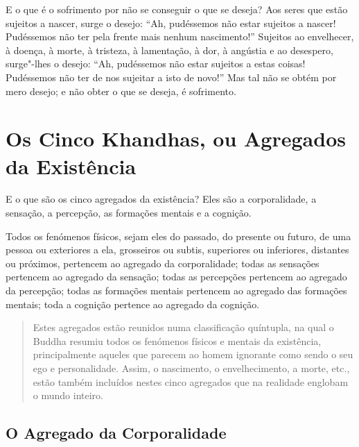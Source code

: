 E o que é o sofrimento por não se conseguir o que se deseja? Aos seres que estão
sujeitos a nascer, surge o desejo: “Ah, pudéssemos não estar sujeitos a nascer!
Pudéssemos não ter pela frente mais nenhum nascimento!” Sujeitos ao
envelhecer, à doença, à morte, à tristeza, à lamentação, à dor, à angústia e ao
desespero, surge"-lhes o desejo: “Ah, pudéssemos não estar sujeitos a estas
coisas! Pudéssemos não ter de nos sujeitar a isto de novo!” Mas tal não se
obtém por mero desejo; e não obter o que se deseja, é sofrimento.


\clearpage

\section{Os Cinco Khandhas, ou Agregados da Existência}


E o que são os cinco agregados da existência? Eles são a corporalidade, a
sensação, a percepção, as formações mentais e a cognição.


Todos os fenómenos físicos, sejam eles do passado, do presente ou futuro, de uma
pessoa ou exteriores a ela, grosseiros ou subtis, superiores ou inferiores,
distantes ou próximos, pertencem ao agregado da corporalidade; todas as
sensações pertencem ao agregado da sensação; todas as percepções pertencem ao
agregado da percepção; todas as formações mentais pertencem ao agregado das
formações mentais; toda a cognição pertence ao agregado da cognição.


\begin{quote}
  Estes agregados estão reunidos numa classificação quíntupla, na qual o Buddha
  resumiu todos os fenómenos físicos e mentais da existência, principalmente
  aqueles que parecem ao homem ignorante como sendo o seu ego e personalidade.
  Assim, o nascimento, o envelhecimento, a morte, etc., estão também 
  incluídos nestes cinco agregados que na realidade englobam o mundo
  inteiro.
\end{quote}

\clearpage

\subsection{O Agregado da Corporalidade}

